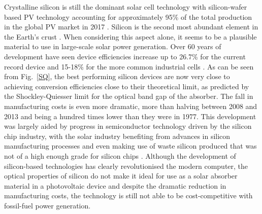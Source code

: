 \documentclass[11pt, twoside]{report}
\begin{document}
Crystalline silicon is still the dominant solar cell technology with silicon-wafer based PV technology accounting for approximately 95\% of the total production in the global PV market in 2017 \cite{Fraunhofer2019}.
Silicon is the second most abundant element in the Earth's crust \cite{Si_abundance}. When considering this aspect alone, it seems to be a plausible material to use in large-scale solar power generation. Over 60 years of development have seen device efficiencies increase up to 26.7\% for the current record device \cite{GreenTables2018} and 15-18\% for the more common industrial cells \cite{Si_rev}. As can be seen from Fig.~\ref{SQ}, the best performing silicon devices are now very close to achieving conversion efficiencies close to their theoretical limit, as predicted by the Shockley-Quiesser limit \cite{SQ_1961} for the optical band gap of the absorber. The fall in manufacturing costs is even more dramatic, more than halving between 2008 and 2013 and being a hundred times lower than they were in 1977. This development was largely aided by progress in semiconductor technology driven by the silicon chip industry, with the solar industry benefiting from advances in silicon manufacturing processes and even making use of waste silicon produced that was not of a high enough grade for silicon chips \cite{PV_history1}. Although the development of silicon-based technologies has clearly revolutionised the modern computer, the optical properties of silicon do not make it ideal for use as a solar absorber material in a photovoltaic device and despite the dramatic reduction in manufacturing costs, the technology is still not able to be cost-competitive with fossil-fuel power generation.

\end{document}
